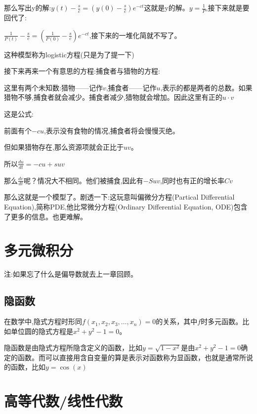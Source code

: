 \documentclass[UTF8]{ctexbook}
\newcommand{\defFunction}[1]{f(#1)}
\begin{document}
{{{{  那么写出y的解:$y(t) - \frac{s}{c} = (y(0) - \frac{s}{c})e^{-ct}$这就是y的解。$y = \frac{1}{P}$,接下来就是要回代了:

  $\frac{1}{P(t)} - \frac{s}{c} = (\frac{1}{P(0)} - \frac{s}{c})e^{-ct}$,接下来的一堆化简就不写了。

  这种模型称为logistic方程(只是为了提一下)

  接下来再来一个有意思的方程:捕食者与猎物的方程:

  这里有两个未知数:猎物——记作$v$,捕食者——记作$u$,表示的都是两者的总数。如果猎物不够,捕食者就会减少。捕食者减少,猎物就会增加。因此这里有正的$u \cdot v$

  这是公式:

  前面有个$-cu$,表示没有食物的情况,捕食者将会慢慢灭绝。

  但如果猎物存在,那么资源项就会正比于$uv$。

  所以$\frac{du}{dt} = -cu + suv$

  那么$\frac{dv}{dt}$呢？情况大不相同。他们被捕食,因此有$-Suv$,同时也有正的增长率$Cv$

  那么这就是一个模型了。剧透一下:这玩意叫偏微分方程(Partical Differential Equation),简称PDE,他比常微分方程(Ordinary Differential Equation, ODE)包含了更多的信息。也更难解。

}%

}%

}%

\section{多元微积分}{
  注:如果忘了什么是偏导数就去上一章回顾。

  \subsection{隐函数}{
    在数学中,隐式方程时形同$\defFunction{x_1,x_2,x_3,\dots,x_n} = 0$的关系，其中$f$时多元函数。比如单位圆的隐式方程是$x^2 + y^2 - 1 = 0$。

    隐函数是由隐式方程所隐含定义的函数，比如$y = \sqrt{1 - x^2}$是由$x^2 + y^2 - 1 = 0$确定的函数。而可以直接用含自变量的算是表示对函数称为显函数，也就是通常所说的函数，比如$y = \cos(x)$


  }%

 }%

\section{高等代数/线性代数}{

}}
\end{document}
